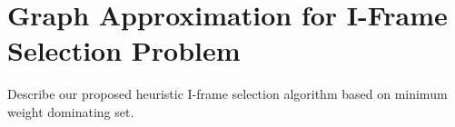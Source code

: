\section{Graph Approximation for I-Frame Selection Problem}
\label{sec::graphApprox}
{\color{red}Describe our proposed heuristic I-frame selection algorithm based on minimum weight dominating set.}
%